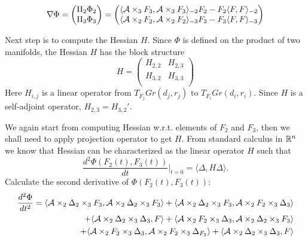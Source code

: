 \begin{equation}
\label{grad_tucker2}
\nabla \Phi = 
\begin{pmatrix}
\Pi{_2} \Phi{_2} \\
\Pi{_3} \Phi{_3}
\end{pmatrix} 
=
\begin{pmatrix}
\langle \mathcal{A} \times_3 {F_3}, \mathcal{A} \times_3 {F_3} \rangle_{-2}{F_2} - {F_2} \langle F, F \rangle_{-2} \\
\langle \mathcal{A} \times_2 {F_2}, \mathcal{A} \times_2 {F_2} \rangle_{-3} {F_3} - {F_3} \langle F, F \rangle_{-3}
\end{pmatrix}
\end{equation}

Next step is to compute the Hessian $H$. Since $\Phi$ is defined on the product
of two manifolds, the Hessian $H$ has the block structure
\begin{equation}
    H = \begin{pmatrix}
        H_{2,2} & H_{2,3} \\
        H_{3,2} & H_{3,3} \\
    \end{pmatrix}
\end{equation}
Here $H_{i,j}$ is a linear operator from $T_{F_j}Gr(d_j, r_j)$ to $T_{F_i}Gr(d_i, r_i)$.
Since $H$ is a self-adjoint operator, $H_{2,3} = H_{3,2}'$.


We again start from computing Hessian
w.r.t. elements of $F_2$ and $F_3$, then we shall need to apply projection 
operator to get $H$. From standard calculus in $\mathbb{R}^n$ we know that
Hessian can be characterized as the linear operator $H$ such that
\begin{equation}
\frac{d^2 \Phi(F_2(t), F_3(t))}{dt} \rvert_{t = 0} = \langle \Delta, H \Delta \rangle.
\end{equation}
Calculate the second derivative of $\Phi(F_2(t), F_3(t))$:
\begin{eqnarray*}
\frac{d^2 \Phi}{dt^2} = \langle \mathcal{A} \times_2 \Delta{_2} \times_3 {F_3}, \mathcal{A} \times_2 \Delta{_2} \times_3 {F_3} \rangle 
+ \langle \mathcal{A} \times_2 \Delta{_2} \times_3 {F_3}, \mathcal{A} \times_2 {F_2} \times_3 \Delta{_3} \rangle \\
+ \langle \mathcal{A} \times_2 \Delta{_2} \times_3 \Delta{_3}, F \rangle 
+ \langle \mathcal{A} \times_2 {F_2} \times_3 \Delta{_3}, \mathcal{A} \times_2 \Delta{_2} \times_3 {F_3} \rangle \\ 
+ \langle \mathcal{A} \times_2 {F_2} \times_3 \Delta{_3}, \mathcal{A} \times_2 {F_2}  \times_3 \Delta_{F_3} \rangle 
+ \langle \mathcal{A} \times_2 \Delta{_2} \times_3 \Delta{_3}, F \rangle 
\end{eqnarray*}

